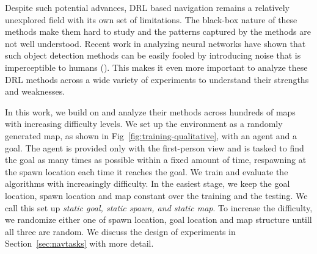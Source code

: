 Despite such potential advances, DRL based navigation remains a relatively unexplored field with its own set of limitations. 
The black-box nature of these methods make them hard to study and the patterns captured by the methods are not well understood. 
Recent work in analyzing neural networks have shown that such object detection methods can be easily fooled by introducing noise that is imperceptible to humans (\cite{NgYoClCVPR2015}). 
This makes it even more important to analyze these DRL methods across a wide variety of experiments to understand their strengths and weaknesses.


In this work, we build on \cite{MiPaViICLR2017} and analyze their methods across hundreds of maps with increasing difficulty levels. 
We set up the environment as a randomly generated map, as shown in Fig~\ref{fig:training-qualitative}, with an agent and a goal.
The agent is provided only with the first-person view and is tasked to find the goal as many times as possible within a fixed amount of time, respawning at the spawn location each time it reaches the goal.
We train and evaluate the algorithms with increasingly difficulty.
In the easiest stage, we keep the goal location, spawn location and map constant over the training and the testing.
We call this set up \emph{static goal, static spawn, and static map}.
To increase the difficulty, we randomize either one of spawn location, goal location and map structure untill all three are random.
We discuss the design of experiments in Section~\ref{sec:navtasks} with more detail.

